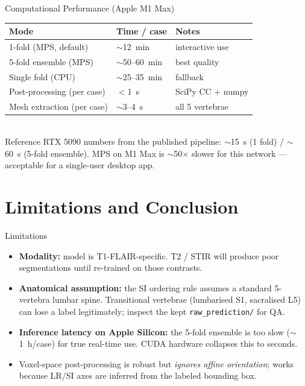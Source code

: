 \documentclass[aspectratio=169,11pt]{beamer}
\begin{document}
\begin{frame}{Computational Performance (Apple M1 Max)}
  \centering
  \begin{tabular}{lll}
    \toprule
    \textbf{Mode} & \textbf{Time / case} & \textbf{Notes} \\ \midrule
    1-fold (MPS, default)         & $\sim$12~min      & interactive use \\
    5-fold ensemble (MPS)         & $\sim$50--60~min  & best quality \\
    Single fold (CPU)             & $\sim$25--35~min  & fallback \\
    Post-processing (per case)    & $<$1~s            & SciPy CC + numpy \\
    Mesh extraction (per case)    & $\sim$3--4~s      & all 5 vertebrae \\
    \bottomrule
  \end{tabular}
  \vspace{0.7em}\\
  \footnotesize
  Reference RTX 5090 numbers from the published pipeline:
  $\sim$15~s (1 fold) / $\sim$60~s (5-fold ensemble). MPS on M1 Max is
  $\sim$50$\times$ slower for this network --- acceptable for a
  single-user desktop app.
\end{frame}

\section{Limitations and Conclusion}

\begin{frame}{Limitations}
  \begin{itemize}
    \item \textbf{Modality:} model is T1-FLAIR-specific. T2 / STIR will
          produce poor segmentations until re-trained on those contrasts.
    \item \textbf{Anatomical assumption:} the SI ordering rule assumes a
          standard 5-vertebra lumbar spine. Transitional vertebrae
          (lumbarised S1, sacralised L5) can lose a label legitimately;
          inspect the kept \texttt{raw\_prediction/} for QA.
    \item \textbf{Inference latency on Apple Silicon:} the 5-fold ensemble
          is too slow ($\sim$1~h/case) for true real-time use.
          CUDA hardware collapses this to seconds.
    \item Voxel-space post-processing is robust but \emph{ignores affine
          orientation}; works because LR/SI axes are inferred from the
          labeled bounding box.
  \end{itemize}
\end{frame}
\end{document}
